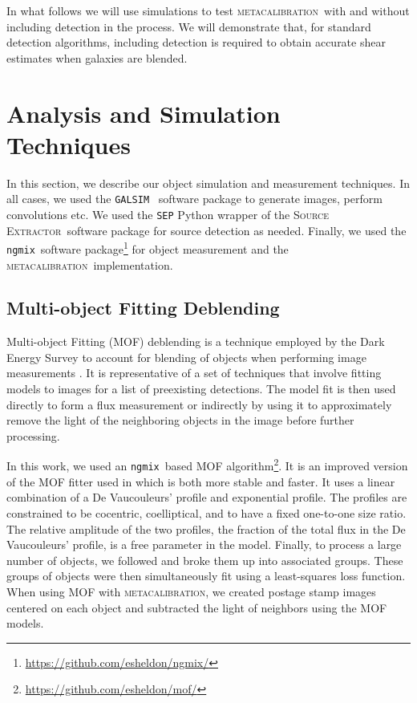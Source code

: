 \documentclass[draft, iop, twocolappendix, appendixfloats, numberedappendix, apj]{hackemulateapj}
\newcommand{\galsim}{\texttt{GALSIM}}
\newcommand{\ngmix}{\texttt{ngmix}}
\newcommand{\mcal}{\textsc{metacalibration}}
\newcommand{\sx}{\textsc{Source Extractor}}
\begin{document}
In what follows we will use simulations to test \mcal\ with and without
including detection in the process.  We will demonstrate that, for standard
detection algorithms, including detection is required to obtain accurate shear
estimates when galaxies are blended.

\section{Analysis and Simulation Techniques}
\label{sec:sims}

In this section, we describe our object simulation and measurement techniques.
In all cases, we used the \galsim\ \citep{GALSIM2015} software package to
generate images, perform convolutions etc. We used the \texttt{SEP} \citep{sep}
Python wrapper of the \sx\ software package \citep{Bertin96} for source
detection as needed. Finally, we used the \ngmix\ software
package\footnote{\url{https://github.com/esheldon/ngmix/}} for object
measurement and the \mcal\ implementation.

\subsection{Multi-object Fitting Deblending} \label{sec:mof}

Multi-object Fitting (MOF) deblending is a technique employed by the Dark
Energy Survey to account for blending of objects when performing image
measurements \citep{DESY1cat}. It is representative of a set of techniques that
involve fitting models to images for a list of preexisting detections. The
model fit is then used directly to form a flux measurement or indirectly by
using it to approximately remove the light of the neighboring objects in the
image before further processing.

In this work, we used an \ngmix\ based MOF
algorithm\footnote{\url{https://github.com/esheldon/mof/}}. It is an improved
version of the MOF fitter used in \cite{DESY1cat} which is both more stable and
faster. It uses a linear combination of a De Vaucouleurs' \citep{devauc1948}
profile and exponential profile. The profiles are constrained to be cocentric,
coelliptical, and to have a fixed one-to-one size ratio.  The relative
amplitude of the two profiles, the fraction of the total flux in the De
Vaucouleurs' profile, is a free parameter in the model. Finally, to process a
large number of objects, we followed \citet{DESY1cat} and broke them up into
associated groups.  These groups of objects were then simultaneously fit using
a least-squares loss function.  When using MOF with \mcal, we created postage
stamp images centered on each object and subtracted the light of neighbors
using the MOF models.
\end{document}
